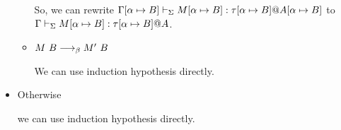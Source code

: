 \begin{itemize}
\begin{itemize}
	      	      So, we can rewrite $\Gamma[\alpha \mapsto B] \vdash_\Sigma M[\alpha \mapsto B] : \tau[\alpha \mapsto B] @ A[\alpha \mapsto B]$ to
	      	      $\Gamma \vdash_\Sigma M[\alpha \mapsto B] : \tau[\alpha \mapsto B] @ A$.
	      	\item $M\ B \longrightarrow_{\beta} M'\ B$
	      	      	      	      	      	      	      	      	      	      	      	      	      	      	      	      		      	      	      	      	      	      	      	      
	      	      We can use induction hypothesis directly.
	      \end{itemize}
	      	      	      	      	      	      	      	      		      	      	      	      
	\item Otherwise
	      	      	      	      	      	      	      	      		      	      	      	      
	      we can use induction hypothesis directly.
\end{itemize}
	
